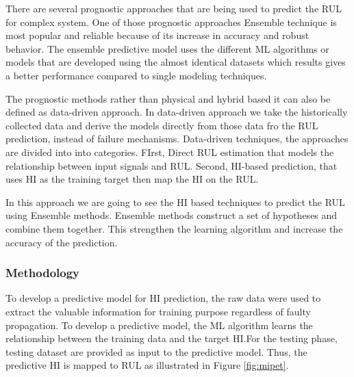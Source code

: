 There are several prognostic approaches that are being used to predict the RUL for complex system. One of those prognostic approaches
Ensemble technique is most popular and reliable because of its increase in accuracy and robust behavior. The ensemble predictive
model uses the different ML algorithms or models that are developed using the almost identical datasets which results gives a better
performance compared to single modeling techniques.

The prognostic methods rather than physical and hybrid based it can also be defined as data-driven approach. In data-driven approach
we take the historically collected data and derive the models directly from those data fro the RUL prediction, instead of failure
mechanisms. Data-driven  techniques, the approaches are divided into into categories. FIrst, Direct RUL estimation that models the
relationship between input signals and RUL. Second, HI-based prediction, that uses HI as the training target then map the HI on the RUL.

In this approach we are going to see the HI based techniques to predict the RUL using Ensemble methods. Ensemble methods construct a set
of hypotheses and combine them together. This strengthen the learning algorithm and increase the accuracy of the prediction.

\subsubsection{Methodology}

To develop a predictive model for HI prediction, the raw data were used to extract the valuable information for training purpose regardless of
faulty propagation. To develop a predictive model, the ML algorithm learns the relationship between the training data and the target HI.For the testing phase, testing dataset are provided as input to the predictive model. Thus, the predictive HI is mapped to RUL as
illustrated in Figure \ref{fig:mipet}.


